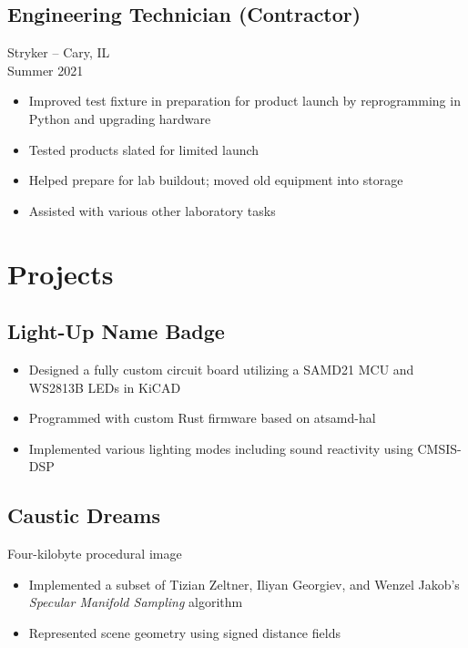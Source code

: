 \documentclass[letterpaper,10pt]{article}
\begin{document}
\begin{paracol}{2}
    \subsection*{Engineering Technician (Contractor)}
    Stryker -- Cary, IL \\
    Summer 2021

    \begin{itemize}[topsep=0.5em, partopsep=0em, itemsep=0.125em]
        \item Improved test fixture in preparation for product launch by reprogramming in Python and upgrading hardware
        \item Tested products slated for limited launch
        \item Helped prepare for lab buildout; moved old equipment into storage
        \item Assisted with various other laboratory tasks
    \end{itemize}

    \section*{Projects}

    \subsection*{Light-Up Name Badge}

    \begin{itemize}[topsep=0.5em, partopsep=0em, itemsep=0.125em]
        \item Designed a fully custom circuit board utilizing a SAMD21 MCU and WS2813B LEDs in KiCAD
        \item Programmed with custom Rust firmware based on atsamd-hal
        \item Implemented various lighting modes including sound reactivity using CMSIS-DSP
    \end{itemize}

    \subsection*{Caustic Dreams}
    Four-kilobyte procedural image

    \begin{itemize}[topsep=0.5em, partopsep=0em, itemsep=0.125em]
        \item Implemented a subset of Tizian Zeltner, Iliyan Georgiev, and Wenzel Jakob's \textit{Specular Manifold Sampling} algorithm
        \item Represented scene geometry using signed distance fields
    \end{itemize}


\end{paracol}
\end{document}
